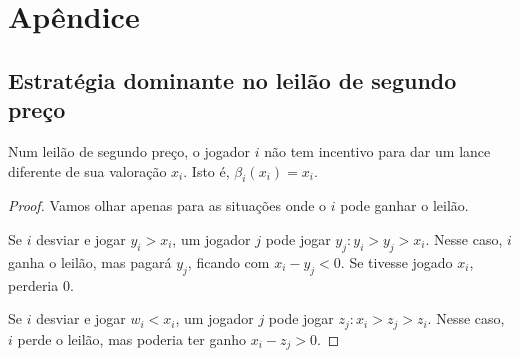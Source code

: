 \chapter{Apêndice}
\label{cap:apendice}

\section{Estratégia dominante no leilão de segundo preço}
\begin{lema}
	Num leilão de segundo preço, o jogador $i$ não tem incentivo para dar um lance diferente de sua valoração $x_i$. Isto é, $\beta_{i}(x_i) = x_i$.
\end{lema}
\begin{proof}
	Vamos olhar apenas para as situações onde o $i$ pode ganhar o leilão.
	
	Se $i$ desviar e jogar $y_i > x_i$, um jogador $j$ pode jogar $y_j : y_i > y_j > x_i$. Nesse caso, $i$ ganha o leilão, mas pagará $y_j$, ficando com $x_i - y_j < 0$. Se tivesse jogado $x_i$, perderia 0.
	
	Se $i$ desviar e jogar $w_i < x_i$, um jogador $j$ pode jogar $z_j : x_i > z_j > z_i$. Nesse caso, $i$ perde o leilão, mas poderia ter ganho $x_i - z_j > 0$.
\end{proof}

